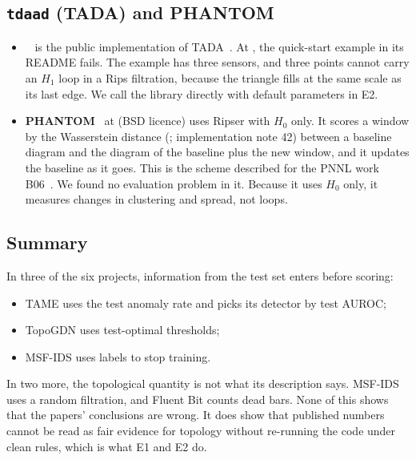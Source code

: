 \subsection{\texttt{tdaad} (TADA) and PHANTOM}
\begin{itemize}
  \item \textbf{}~\cite{tdaad_repo} is the public implementation of TADA~\cite{H04}. At , the quick-start example in its README fails. The example has three sensors, and three points cannot carry an $H_1$ loop in a Rips filtration, because the triangle fills at the same scale as its last edge.  We call the library directly with default parameters in E2.
  \item \textbf{PHANTOM}~\cite{phantom_repo} at  (BSD licence) uses Ripser with $H_0$ only. It scores a window by the Wasserstein distance (; implementation note 42) between a baseline diagram and the diagram of the baseline plus the new window, and it updates the baseline as it goes. This is the scheme described for the PNNL work B06~\citep{B06}. We found no evaluation problem in it. Because it uses $H_0$ only, it measures changes in clustering and spread, not loops.
\end{itemize}

\subsection{Summary}
In three of the six projects, information from the test set enters before scoring:
\begin{itemize}
  \item TAME uses the test anomaly rate and picks its detector by test AUROC;
  \item TopoGDN uses test-optimal thresholds;
  \item MSF-IDS uses labels to stop training.
\end{itemize}
In two more, the topological quantity is not what its description says. MSF-IDS uses a random filtration, and Fluent Bit counts dead bars. None of this shows that the papers' conclusions are wrong. It does show that published numbers cannot be read as fair evidence for topology without re-running the code under clean rules, which is what E1 and E2 do. 
